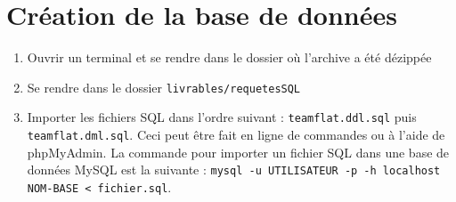 \documentclass[a4paper, 12pt, french]{article}
\begin{document}
	\section{Création de la base de données}
	\begin{enumerate}
		\item Ouvrir un terminal et se rendre dans le dossier où l'archive a été dézippée
		\item Se rendre dans le dossier \texttt{livrables/requetesSQL}
		\item Importer les fichiers SQL dans l'ordre suivant : \texttt{teamflat.ddl.sql} puis \texttt{teamflat.dml.sql}. Ceci peut être fait en ligne de commandes ou à l'aide de phpMyAdmin. La commande pour importer un fichier SQL dans une base de données MySQL est la suivante : \texttt{mysql -u UTILISATEUR -p -h localhost NOM-BASE < fichier.sql}.
	\end{enumerate}
\end{document}
